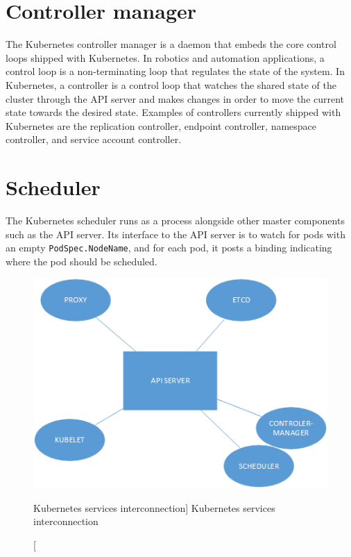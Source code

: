 \section{Controller manager}
The Kubernetes controller manager is a daemon that embeds the core control loops shipped with Kubernetes. In robotics and automation applications, a control loop is a non-terminating loop that regulates the state of the system. In Kubernetes, a controller is a control loop that watches the shared state of the cluster through the API server and makes changes in order to move the current state towards the desired state. Examples of controllers currently shipped with Kubernetes are the replication controller, endpoint controller, namespace controller, and service account controller. \cite{kubernetesdoc}

\section{Scheduler}
The Kubernetes scheduler runs as a process alongside other master components such as the API server. Its interface to the API server is to watch for pods with an empty \lstinline{PodSpec.NodeName}, and for each pod, it posts a binding indicating where the pod should be scheduled.

\begin{figure}[htb]\centering
  \includegraphics[width=1\textwidth]{images/kubernetes-services.png}
  \caption
    [Kubernetes services interconnection]
    {Kubernetes services interconnection \cite{tomkukral}}
  \label{fig:kubernetes-services}
\end{figure}

